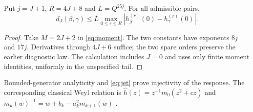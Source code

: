 \begin{theorem}
\label{thm:jet}
Put $j=J+1$, $R=4J+8$ and $L=Q^{25j}$. For all admissible pairs,
\begin{equation}
 d_J(\beta,\gamma)\le L\max_{0\le r\le R}
 |h_\beta^{(r)}(0)-h_\gamma^{(r)}(0)|.
 \label{eq:jet}
\end{equation}
\end{theorem}
\begin{proof}
Take $M=2J+2$ in \eqref{eq:moment}. The two constants have exponents
$8j$ and $17j$. Derivatives through $4J+6$ suffice; the two spare orders
preserve the earlier diagnostic law. The calculation includes $J=0$ and uses
only finite moment identities, uniformly in the unspecified tail.
\end{proof}
Bounded-generator analyticity and \eqref{eq:jet} prove injectivity of the response.
The corresponding classical Weyl relation is
$\widehat h(z)=z^{-1}m_0(z^2+cz)$ and
$m_k(w)^{-1}=w+b_k-a_k^2m_{k+1}(w)$ \cite{Teschl}.
